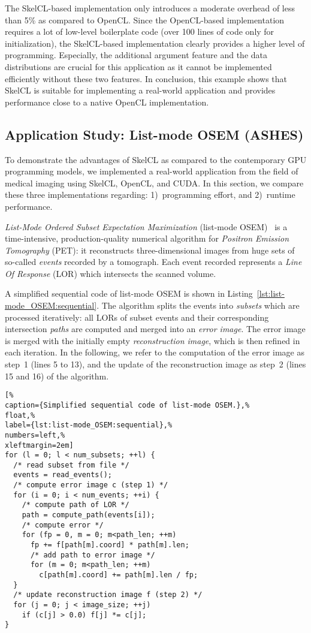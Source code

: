 The SkelCL-based implementation only introduces a moderate overhead of less than 5\% as compared to OpenCL.
Since the OpenCL-based implementation requires a lot of low-level boilerplate code (over 100 lines of code only for initialization), the SkelCL-based implementation clearly provides a higher level of programming.
Especially, the additional argument feature and the data distributions are crucial for this application as it cannot be implemented efficiently without these two features.
In conclusion, this example shows that SkelCL is suitable for implementing a real-world application and provides performance close to a native OpenCL implementation.

\subsection{Application Study: List-mode OSEM (ASHES)}

To demonstrate the advantages of SkelCL as compared to the contemporary GPU programming models, we implemented a real-world application from the field of medical imaging using SkelCL, OpenCL, and CUDA.
In this section, we compare these three implementations regarding: 1)~programming effort, and 2)~runtime performance.

\emph{List-Mode Ordered Subset Expectation Maximization} (list-mode OSEM)~\cite{Reader98,KSW-11} is a time-intensive, production-quality numerical algorithm for \emph{Positron Emission Tomography} (PET):
it reconstructs three-dimensional images from huge sets of so-called \emph{events} recorded by a tomograph.
Each event recorded represents a \emph{Line Of Response} (LOR) which intersects the scanned volume.

A simplified sequential code of list-mode OSEM is shown in Listing~\ref{lst:list-mode_OSEM:sequential}.
The algorithm splits the events into \emph{subsets} which are processed iteratively:
all LORs of subset events and their corresponding intersection \emph{paths} are computed and merged into an \emph{error image}.
The {error image} is merged with the initially empty \emph{reconstruction image}, which is then refined in each iteration.
In the following, we refer to the computation of the error image as step~1 (lines 5 to 13), and the update of the reconstruction image as step~2 (lines 15 and 16) of the algorithm.

\begin{lstlisting}[%
caption={Simplified sequential code of list-mode OSEM.},%
float,%
label={lst:list-mode_OSEM:sequential},%
numbers=left,%
xleftmargin=2em]
for (l = 0; l < num_subsets; ++l) {
  /* read subset from file */
  events = read_events();
  /* compute error image c (step 1) */
  for (i = 0; i < num_events; ++i) {
    /* compute path of LOR */
    path = compute_path(events[i]);
    /* compute error */
    for (fp = 0, m = 0; m<path_len; ++m)
      fp += f[path[m].coord] * path[m].len;
      /* add path to error image */
      for (m = 0; m<path_len; ++m)
        c[path[m].coord] += path[m].len / fp;
  }
  /* update reconstruction image f (step 2) */
  for (j = 0; j < image_size; ++j)
    if (c[j] > 0.0) f[j] *= c[j];
}
\end{lstlisting}

